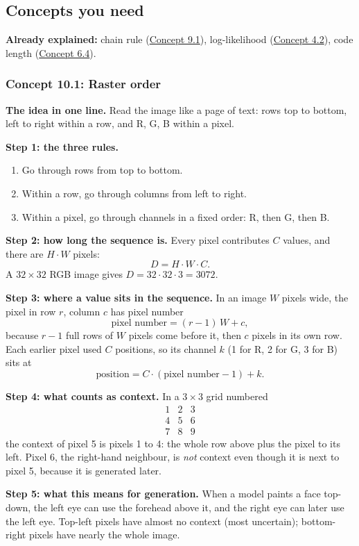 \documentclass[12pt,a4paper]{article}
\begin{document}
\subsection{Concepts you need}

\textbf{Already explained:} chain rule (\hyperref[c9-1]{Concept 9.1}), log-likelihood (\hyperref[c4-2]{Concept 4.2}), code length (\hyperref[c6-4]{Concept 6.4}).

\subsubsection{Concept 10.1: Raster order}\label{c10-1}

\textbf{The idea in one line.} Read the image like a page of text: rows top to bottom, left to right within a row, and R, G, B within a pixel.

\textbf{Step 1: the three rules.}
\begin{enumerate}[nosep]
  \item Go through rows from top to bottom.
  \item Within a row, go through columns from left to right.
  \item Within a pixel, go through channels in a fixed order: R, then G, then B.
\end{enumerate}

\textbf{Step 2: how long the sequence is.} Every pixel contributes $C$ values, and there are $H\cdot W$ pixels:
\[
D=H\cdot W\cdot C .
\]
A $32\times32$ RGB image gives $D=32\cdot32\cdot3=3072$.

\textbf{Step 3: where a value sits in the sequence.} In an image $W$ pixels wide, the pixel in row $r$, column $c$ has pixel number
\[
\text{pixel number}=(r-1)\,W+c,
\]
because $r-1$ full rows of $W$ pixels come before it, then $c$ pixels in its own row. Each earlier pixel used $C$ positions, so its channel $k$ (1 for R, 2 for G, 3 for B) sits at
\[
\text{position}=C\cdot(\text{pixel number}-1)+k .
\]

\textbf{Step 4: what counts as context.} In a $3\times3$ grid numbered
\[
\begin{matrix}1&2&3\\4&5&6\\7&8&9\end{matrix}
\]
the context of pixel 5 is pixels 1 to 4: the whole row above plus the pixel to its left. Pixel 6, the right-hand neighbour, is \emph{not} context even though it is next to pixel 5, because it is generated later.

\textbf{Step 5: what this means for generation.} When a model paints a face top-down, the left eye can use the forehead above it, and the right eye can later use the left eye. Top-left pixels have almost no context (most uncertain); bottom-right pixels have nearly the whole image.
\end{document}
